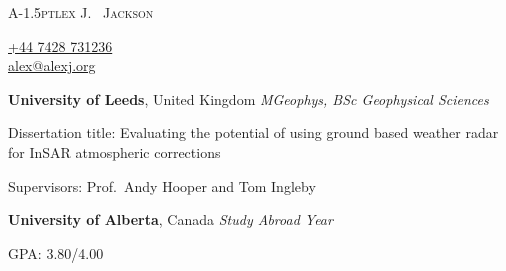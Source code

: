 \documentclass[11pt]{article}
\makeatletter
\def\myemail{alex@alexj.org}
\def\myweb{alexjohnj}
\def\myphone{+44 7428 731236}
\makeatother
\begin{document}
\flushbottom
\pagestyle{fancy} \setlength\headwidth{6.5in}
\thispagestyle{empty}
\begin{adjustwidth}{-1in}{}
  {\Huge
    {\sffamily\textsc{%
        {A}\kern-1.5ptlex
        {J}\kern-2pt.~%
        {J}ackson}
    }
  }
  \hfill\hfill\hfill
  {
    \begin{minipage}[b]{2in}
      \flushleft \footnotesize
    \end{minipage}
    \hfill
    \begin{minipage}[b]{1.2in}
      \flushright \footnotesize
      \href{tel:\myphone}{\myphone} \\
      \href{mailto:\myemail}{\myemail} \\
    \end{minipage}
  }\par
  \hrulefill
\end{adjustwidth}
\reversemarginpar
\setlength\marginparwidth{0.85in}
\smallskip
%
\textbf{University of Leeds}, United Kingdom \newline
\emph{MGeophys, BSc Geophysical Sciences} 
\begin{itemize*}
\item Dissertation title: Evaluating the potential of using ground based weather
  radar for InSAR atmospheric corrections
\item Supervisors: Prof.~Andy Hooper and Tom Ingleby
\end{itemize*}

\medskip
\textbf{University of Alberta}, Canada \newline
\emph{Study Abroad Year} 
\begin{itemize*}
\item GPA\@: 3.80/4.00
\end{itemize*}
\end{document}
